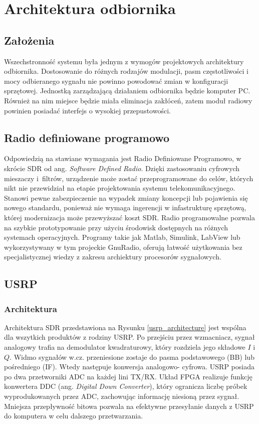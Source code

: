 \chapter{Architektura odbiornika}

\section{Założenia}
Wszechstronność systemu była jednym z wymogów projektowych architektury odbiornika. 
Dostosowanie do różnych rodzajów modulacji, pasm częstotliwości i mocy odbieranego sygnału nie powinno powodować zmian w konfiguracji sprzętowej.
Jednostką zarządzającą działaniem odbiornika będzie komputer PC.
Również na nim miejsce będzie miała eliminacja zakłóceń, zatem moduł radiowy powinien posiadać interfejs o wysokiej przepustowości.

\section{Radio definiowane programowo}
Odpowiedzią na stawiane wymagania jest Radio Definiowane Programowo, w skrócie SDR od ang. \textit{Software Defined Radio}.
Dzięki zastosowaniu cyfrowych mieszaczy i~filtrów, urządzenie może zostać przeprogramowane do celów, których nikt nie przewidział na etapie projektowania systemu telekomunikacyjnego.
Stanowi pewne zabezpieczenie na wypadek zmiany koncepcji lub pojawienia się nowego standardu, ponieważ nie wymaga ingerencji w infastrukturę sprzętową, której modernizacja może przewyższać koszt SDR.
Radio programowalne pozwala na szybkie prototypowanie przy użyciu środowisk dostępnych na różnych systemach operacyjnych. 
Programy takie jak Matlab, Simulink, LabView lub wykorzystywany w tym projeckie GnuRadio, oferują łatwość użytkowania bez specjalistycznej wiedzy z zakresu archiektury procesorów sygnałowych. \cite{ImplementingSDR:92304} 

\section{USRP}
\subsection{Architektura}
Architektura SDR przedstawiona na Rysunku \ref{usrp_architecture} jest wspólna dla wszytkich produktów z rodziny USRP. Po przejściu przez wzmacniacz, sygnał analogowy trafia na demodulator kwadraturowy, który rozdziela jego składowe $I$ i $Q$. 
Widmo sygnałów w.cz. przeniesione zostaje do pasma podstawowego (BB) lub pośredniego (IF). 
Wtedy następuje konwersja analogowo- cyfrowa. 
USRP posiada po dwa przetworniki ADC na każdej lini TX/RX.
Układ FPGA realizuje funkcję konwertera DDC (ang. \textit{Digital Down Converter}), który ogranicza liczbę próbek wyprodukowanych przez ADC, zachowując informację niesioną przez sygnał.
Mniejsza przepływność bitowa pozwala na efektywne przesyłanie danych z USRP do komputera w celu dalszego przetwarzania. \cite{usrp_bw}

